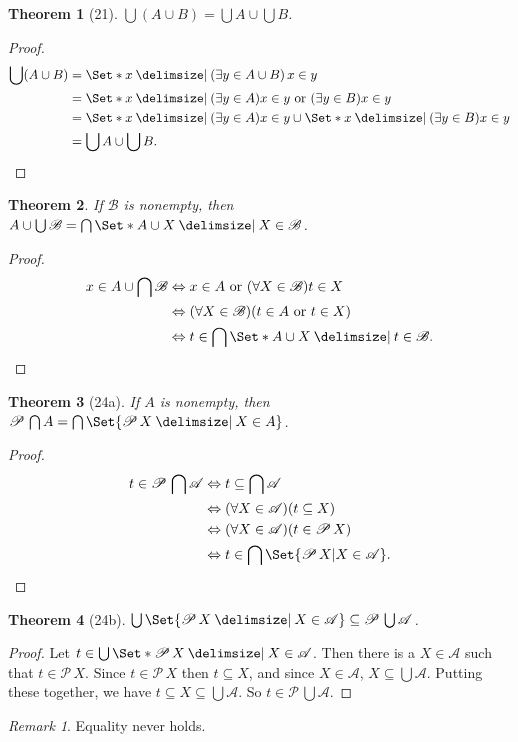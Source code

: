 \documentclass[12pt]{article}
\theoremstyle{plain}
\newtheorem*{exthm}{Theorem}
\theoremstyle{remark}
\theoremstyle{definition}
\theoremstyle{remark}
\newtheorem*{remark}{Remark}
\newcommand{\powerset}{\mathscr{P}\,}
\providecommand\st{}
\newcommand\SetSymbol[1][]{%
\nonscript\:#1\vert%
\allowbreak%
\nonscript\:
\mathopen{}}
\renewcommand\st{\SetSymbol[\delimsize]}
\renewcommand{\iff}{\Leftrightarrow}
\begin{document}
\begin{exthm}[21]
$\bigcup (A \cup B) = \bigcup A \cup \bigcup B$.
\end{exthm}
\begin{proof}
\begin{align*}
\bigcup (A \cup B) &= \Set*{x \st (\exists y \in A \cup B)\, x \in y}\\
&= \Set*{x \st (\exists y \in A)x \in y \text{ or } (\exists y \in B) x \in y}\\
&= \Set*{x \st (\exists y \in A)x \in y} \cup \Set*{x \st (\exists y \in B) x \in y}\\
&= \bigcup A \cup \bigcup B.
\end{align*}
\end{proof}
\begin{exthm}
If $\mathscr{B}$ is nonempty, then $A \cup \bigcup \mathscr{B} = \bigcap \Set*{A \cup X \st X \in \mathscr{B}}$.
\end{exthm}
\begin{proof}
\begin{align*}
x \in A \cup \bigcap \mathscr{B} &\iff x \in A \text{ or } (\forall X \in \mathscr{B}) t \in X\\
&\iff (\forall X \in \mathscr{B}) (t \in A \text{ or } t \in X)\\
&\iff t \in \bigcap\Set*{A \cup X \st t \in \mathscr{B}}.
\end{align*}
\end{proof}

\begin{exthm}[24a]
If $A$ is nonempty, then $\powerset \bigcap A = \bigcap \Set{\powerset X \st X \in A}$.
\end{exthm}
\begin{proof}
\begin{align*}
t \in \powerset \bigcap \mathscr{A} &\iff t \subseteq \bigcap \mathscr{A}\\
&\iff (\forall X \in \mathscr{A}) (t \subseteq X)\\
&\iff (\forall X \in \mathscr{A}) (t \in \powerset X)\\
&\iff t \in \bigcap \Set{\powerset X | X \in \mathscr{A}}.
\end{align*}
\end{proof}

\begin{exthm}[24b]
$\bigcup \Set{\powerset X \st X \in \mathscr{A}} \subseteq \powerset \bigcup \mathscr{A}$.
\end{exthm}
\begin{proof}
Let $t \in \bigcup \Set*{\powerset X \st X \in \mathscr{A}}$. Then there is a $X \in \mathscr{A}$ such that $t \in \powerset X$. Since $t \in \powerset X$ then $t \subseteq X$, and since $X \in \mathscr{A}$, $X \subseteq \bigcup \mathscr{A}$. Putting these together, we have $t \subseteq X \subseteq \bigcup \mathscr{A}$. So $t \in \powerset \bigcup \mathscr{A}$.
\end{proof}
\begin{remark}
Equality never holds.
\end{remark}
\end{document}
